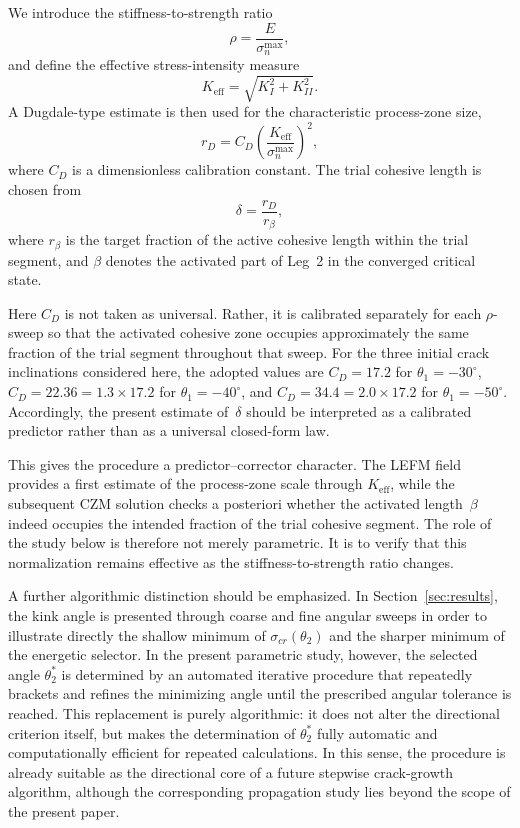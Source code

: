 \documentclass[smallextended]{svjour3}       %
\begin{document}
We introduce the stiffness-to-strength ratio
\begin{equation}
	\rho=\frac{E}{\sigma_n^{\max}},
\end{equation}
and define the effective stress-intensity measure
\begin{equation}
	K_{\mathrm{eff}}=\sqrt{K_I^2+K_{II}^2}.
\end{equation}
A Dugdale-type estimate is then used for the characteristic process-zone size,
\begin{equation}
	r_D=C_D\left(\frac{K_{\mathrm{eff}}}{\sigma_n^{\max}}\right)^2,
\end{equation}
where $C_D$ is a dimensionless calibration constant. The trial cohesive length
is chosen from
\begin{equation}
	\delta=\frac{r_D}{r_\beta},
\end{equation}
where $r_\beta$ is the target fraction of the active cohesive length within
the trial segment, and $\beta$ denotes the activated part of Leg~2 in the
converged critical state.

Here $C_D$ is not taken as universal. Rather, it is calibrated separately for
each $\rho$-sweep so that the activated cohesive zone occupies approximately
the same fraction of the trial segment throughout that sweep. For the three
initial crack inclinations considered here, the adopted values are
$C_D=17.2$ for $\theta_1=-30^\circ$,
$C_D=22.36=1.3\times 17.2$ for $\theta_1=-40^\circ$, and
$C_D=34.4=2.0\times 17.2$ for $\theta_1=-50^\circ$. Accordingly, the present
estimate of~$\delta$ should be interpreted as a calibrated predictor rather
than as a universal closed-form law.

This gives the procedure a predictor--corrector character. The LEFM field
provides a first estimate of the process-zone scale through $K_{\mathrm{eff}}$,
while the subsequent CZM solution checks a posteriori whether the activated
length~$\beta$ indeed occupies the intended fraction of the trial cohesive
segment. The role of the study below is therefore not merely parametric. It is
to verify that this normalization remains effective as the stiffness-to-strength
ratio changes.

A further algorithmic distinction should be emphasized. In Section~\ref{sec:results}, the kink
angle is presented through coarse and fine angular sweeps in order to
illustrate directly the shallow minimum of $\sigma_{cr}(\theta_2)$ and the
sharper minimum of the energetic selector. In the present parametric study,
however, the selected angle $\theta_2^\ast$ is determined by an automated
iterative procedure that repeatedly brackets and refines the minimizing angle
until the prescribed angular tolerance is reached. This replacement is purely
algorithmic: it does not alter the directional criterion itself, but makes the
determination of $\theta_2^\ast$ fully automatic and computationally efficient
for repeated calculations. In this sense, the procedure is already suitable as
the directional core of a future stepwise crack-growth algorithm, although the
corresponding propagation study lies beyond the scope of the present paper.
\end{document}
